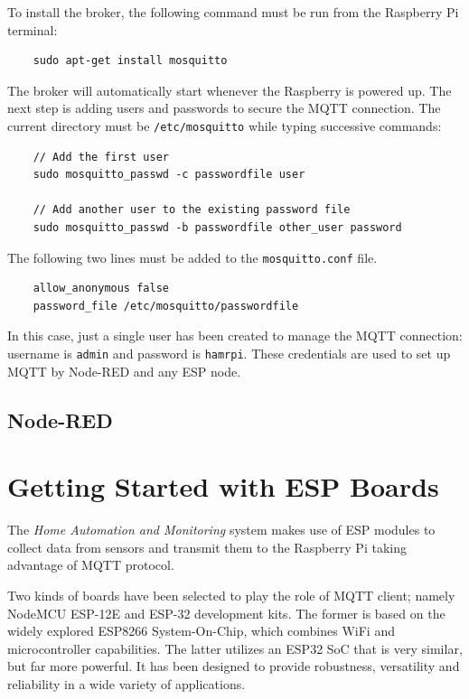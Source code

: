 To install the broker, the following command must be run from the Raspberry Pi terminal:

\begin{verbatim}
    sudo apt-get install mosquitto
\end{verbatim}

\noindent
The broker will automatically start whenever the Raspberry is powered up. The next step is adding users and passwords to secure the MQTT connection. The current directory must be \texttt{/etc/mosquitto} while typing successive commands:

\begin{verbatim}
    // Add the first user
    sudo mosquitto_passwd -c passwordfile user
    
    // Add another user to the existing password file
    sudo mosquitto_passwd -b passwordfile other_user password
\end{verbatim}

\noindent
The following two lines must be added to the \texttt{mosquitto.conf} file.

\begin{verbatim}
    allow_anonymous false
    password_file /etc/mosquitto/passwordfile
\end{verbatim}

\noindent
In this case, just a single user has been created to manage the MQTT connection: username is \texttt{admin} and password is \texttt{hamrpi}. These credentials are used to set up MQTT by Node-RED and any ESP node.

\subsection{Node-RED}

\section{Getting Started with ESP Boards}
The \textit{Home Automation and Monitoring} system makes use of ESP modules to collect data from sensors and transmit them to the Raspberry Pi taking advantage of MQTT protocol.

Two kinds of boards have been selected to play the role of MQTT client; namely NodeMCU ESP-12E and ESP-32 development kits. The former is based on the widely explored ESP8266 System-On-Chip, which combines WiFi and microcontroller capabilities. The latter utilizes an ESP32 SoC that is very similar, but far more powerful. It has been designed to provide robustness, versatility and reliability in a wide variety of applications.

